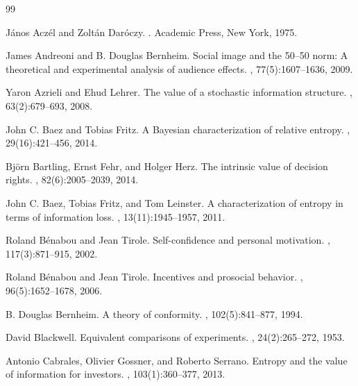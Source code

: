 \documentclass[11pt,a4paper]{article}
\theoremstyle{definition}
\newcommand{\1}{\mathbf 1}
\begin{document}
\sloppy
\begin{thebibliography}{99}
\raggedright

J\'anos Acz\'el and Zolt\'an Dar\'oczy.
.
\newblock Academic Press, New York, 1975.

James Andreoni and B. Douglas Bernheim.
\newblock Social image and the 50--50 norm: A theoretical and experimental analysis of audience effects.
, 77(5):1607--1636, 2009.

Yaron Azrieli and Ehud Lehrer.
\newblock The value of a stochastic information structure.
, 63(2):679--693, 2008.

John C. Baez and Tobias Fritz.
\newblock A {B}ayesian characterization of relative entropy.
, 29(16):421--456, 2014.

Bj\"orn Bartling, Ernst Fehr, and Holger Herz.
\newblock The intrinsic value of decision rights.
, 82(6):2005--2039, 2014.

John C. Baez, Tobias Fritz, and Tom Leinster.
\newblock A characterization of entropy in terms of information loss.
, 13(11):1945--1957, 2011.

Roland B\'enabou and Jean Tirole.
\newblock Self-confidence and personal motivation.
, 117(3):871--915, 2002.

Roland B\'enabou and Jean Tirole.
\newblock Incentives and prosocial behavior.
, 96(5):1652--1678, 2006.

B. Douglas Bernheim.
\newblock A theory of conformity.
, 102(5):841--877, 1994.

David Blackwell.
\newblock Equivalent comparisons of experiments.
, 24(2):265--272, 1953.

Antonio Cabrales, Olivier Gossner, and Roberto Serrano.
\newblock Entropy and the value of information for investors.
, 103(1):360--377, 2013.


\end{thebibliography}
\end{document}
